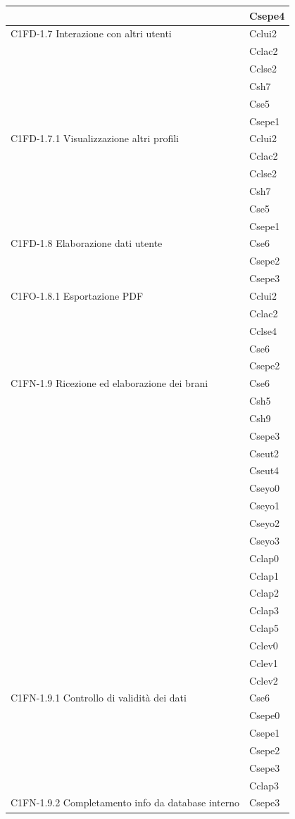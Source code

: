\begin{footnotesize}
\begin{longtable}[!h]{|l|l|}
& Csepe4\\\hline  
C1FD-1.7 Interazione con altri utenti & Cclui2\\
& Cclac2\\
& Cclse2\\
& Csh7\\
& Cse5\\
& Csepe1\\\hline     
C1FD-1.7.1 Visualizzazione altri profili & Cclui2\\
& Cclac2\\
& Cclse2\\
& Csh7\\
& Cse5\\
& Csepe1\\\hline  
C1FD-1.8 Elaborazione dati utente & Cse6\\
& Csepe2\\
& Csepe3\\\hline   
C1FO-1.8.1 Esportazione PDF & Cclui2\\
& Cclac2\\
& Cclse4\\
& Cse6\\
& Csepe2  \\\hline  
C1FN-1.9 Ricezione ed elaborazione dei brani & Cse6\\
& Csh5\\
& Csh9\\
& Csepe3\\
& Cseut2\\
& Cseut4\\
& Cseyo0\\
& Cseyo1\\
& Cseyo2\\
& Cseyo3\\
& Cclap0\\
& Cclap1\\
& Cclap2\\
& Cclap3\\
& Cclap5\\
& Cclev0\\
& Cclev1\\
& Cclev2\\\hline  
C1FN-1.9.1 Controllo di validit\`a dei dati & Cse6\\
& Csepe0\\
& Csepe1\\
& Csepe2\\
& Csepe3\\
& Cclap3\\\hline 
C1FN-1.9.2 Completamento info da database interno & Csepe3 \\\hline   

\end{longtable}
\end{footnotesize}
